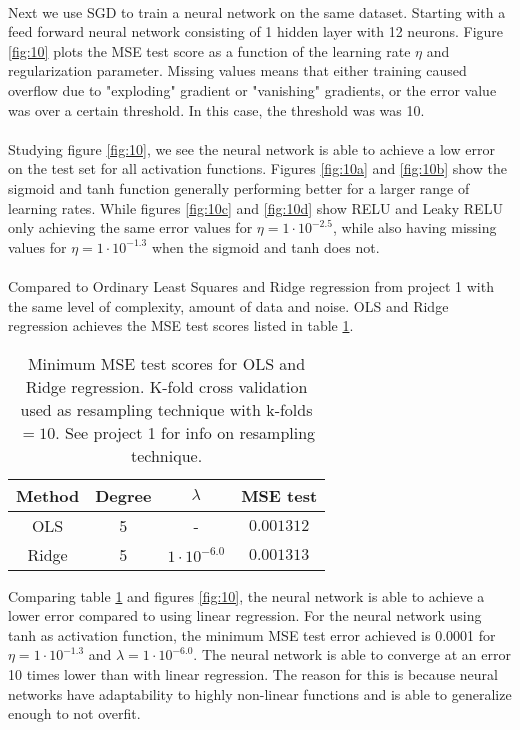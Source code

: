 \documentclass[a4paper,twocolumn]{article}
\begin{document}
\\
Next we use SGD to train a neural network on the same dataset. Starting with a feed forward neural network consisting of 1 hidden layer with 12 neurons. Figure \ref{fig:10} plots the MSE test score as a function of the learning rate $\eta$ and regularization parameter. Missing values means that either training caused overflow due to "exploding" gradient or "vanishing" gradients, or the error value was over a certain threshold. In this case, the threshold was was 10.\\
\\
Studying figure \ref{fig:10}, we see the neural network is able to achieve a low error on the test set for all activation functions. Figures \ref{fig:10a} and \ref{fig:10b} show the sigmoid and tanh function generally performing better for a larger range of learning rates. While figures \ref{fig:10c} and \ref{fig:10d} show RELU and Leaky RELU only achieving the same error values for $\eta = 1\cdot 10^{-2.5}$, while also having missing values for $\eta = 1\cdot 10^{-1.3}$ when the sigmoid and tanh does not.\\
\\
Compared to Ordinary Least Squares and Ridge regression from project 1 with the same level of complexity, amount of data and noise. OLS and Ridge regression achieves the MSE test scores listed  in table \ref{tab:1}.
\begin{table}[h]
    \centering
    \caption{Minimum MSE test scores for OLS and Ridge regression. K-fold cross validation used as resampling technique with k-folds $= 10$. See project 1 for info on resampling technique.}
    \label{tab:1}
    \begin{tabular}{|c||c|c|c|}
    \hline
        Method & Degree & $\lambda$ & MSE test \\ 
        \hline\hline
        OLS & 5 & - & $0.001312$ \\ 
        \hline
        Ridge & 5 & $1\cdot 10^{-6.0}$ & $0.001313$ \\
        \hline
    \end{tabular}
\end{table}
Comparing table \ref{tab:1} and figures \ref{fig:10}, the neural network is able to achieve a lower error compared to using linear regression. For the neural network using tanh as activation function, the minimum MSE test error achieved is 0.0001 for $\eta = 1\cdot 10^{-1.3}$ and $\lambda = 1\cdot 10^{-6.0}$. The neural network is able to converge at an error 10 times lower than with linear regression. The reason for this is because neural networks have adaptability to highly non-linear functions and is able to generalize enough to not overfit.\\
\end{document}
